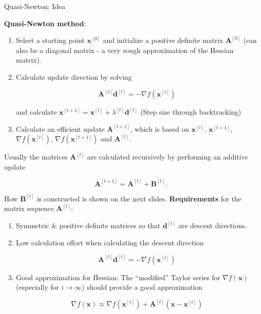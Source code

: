 \documentclass[11pt,compress,t,notes=noshow, xcolor=table]{beamer}
\begin{document}
\begin{vbframe}{Quasi-Newton: Idea}
\framebreak

\textbf{Quasi-Newton method}:


\begin{enumerate}
\item Select a starting point $\mathbf{x}^{[0]}$ and initialize a positive definite matrix
$\mathbf{A}^{[0]}$ (can also be a diagonal matrix - a very rough approximation of the
Hessian matrix).
\item Calculate update direction by solving

$$
\bm{A}^{[t]} \bm{d}^{[t]} = - \nabla f(\mathbf{x}^{[t]})
$$

and calculate $\bm{x}^{[t+1]} = \bm{x}^{[t]} + \lambda^{[t]} \bm{d}^{[t]}$ (Step size through backtracking)
\item Calculate an efficient update $\mathbf{A}^{[t+1]}$, which is based on $\mathbf{x}^{[t]}$,
$\mathbf{x}^{[t+1]}$, $\nabla f(\mathbf{x}^{[t]})$, $\nabla f(\mathbf{x}^{[t+1]})$ and
$\mathbf{A}^{[t]}$.
\end{enumerate}

\framebreak

Usually the matrices $\bm{A}^{[t]}$ are calculated recursively by performing an additive update 

$$
\bm{A}^{[t+1]} = \bm{A}^{[t]} + \bm{B}^{[t]}. 
$$

How $ \bm{B}^{[t]}$ is constructed is shown on the next slides. 
\textbf{Requirements} for the matrix sequence $\bm{A}^{[t]}$:
\begin{enumerate}
\item Symmetric \& positive definite matrices so that $\bm{d}^{[t]}$ are descent directions.
\item Low calculation effort when calculating the descent direction

$$
\bm{A}^{[t]} \bm{d}^{[t]} = - \nabla f(\mathbf{x}^{[t]})
$$

\item Good approximation for Hessian: The \enquote{modified} Taylor series for $\nabla f(\bm{x})$ (especially for $i \to \infty$) should provide a good approximation

$$
\nabla f(\mathbf{x}) \approx \nabla f(\mathbf{x}^{[t]}) +
\bm{A}^{[t]}(\mathbf{x} - \mathbf{x}^{[t]})
$$
\end{enumerate}



\end{vbframe}
\end{document}
